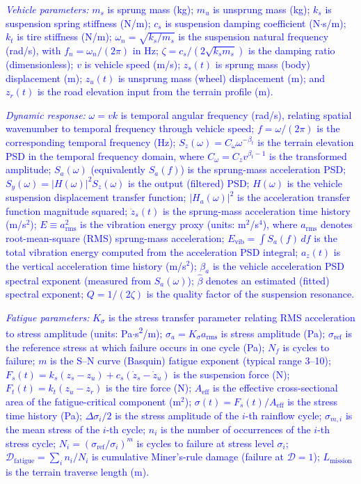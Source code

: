 \documentclass[11pt]{article}
\begin{document}
\textcolor{blue}{\textit{Vehicle parameters:} $m_s$ is sprung mass (kg); $m_u$ is unsprung mass (kg); $k_s$ is suspension spring stiffness (N/m); $c_s$ is suspension damping coefficient (N$\cdot$s/m); $k_t$ is tire stiffness (N/m); $\omega_n = \sqrt{k_s/m_s}$ is the suspension natural frequency (rad/s), with $f_n = \omega_n/(2\pi)$ in Hz; $\zeta = c_s/(2\sqrt{k_s m_s})$ is the damping ratio (dimensionless); $v$ is vehicle speed (m/s); $z_s(t)$ is sprung mass (body) displacement (m); $z_u(t)$ is unsprung mass (wheel) displacement (m); and $z_r(t)$ is the road elevation input from the terrain profile (m).}

\textcolor{blue}{\textit{Dynamic response:} $\omega = vk$ is temporal angular frequency (rad/s), relating spatial wavenumber to temporal frequency through vehicle speed; $f = \omega/(2\pi)$ is the corresponding temporal frequency (Hz); $S_z(\omega) = C_\omega \omega^{-\beta_t}$ is the terrain elevation PSD in the temporal frequency domain, where $C_\omega = C_z v^{\beta_t - 1}$ is the transformed amplitude; $S_a(\omega)$ (equivalently $S_a(f)$) is the sprung-mass acceleration PSD; $S_y(\omega) = |H(\omega)|^2 S_z(\omega)$ is the output (filtered) PSD; $H(\omega)$ is the vehicle suspension displacement transfer function; $|H_a(\omega)|^2$ is the acceleration transfer function magnitude squared; $\ddot{z}_s(t)$ is the sprung-mass acceleration time history (m/s$^2$); $E \equiv a_{\mathrm{rms}}^2$ is the vibration energy proxy (units: m$^2$/s$^4$), where $a_{\mathrm{rms}}$ denotes root-mean-square (RMS) sprung-mass acceleration; $E_{\mathrm{vib}} = \int S_a(f)\,df$ is the total vibration energy computed from the acceleration PSD integral; $a_z(t)$ is the vertical acceleration time history (m/s$^2$); $\beta_a$ is the vehicle acceleration PSD spectral exponent (measured from $S_a(\omega)$); $\hat{\beta}$ denotes an estimated (fitted) spectral exponent; $Q = 1/(2\zeta)$ is the quality factor of the suspension resonance.}

\textcolor{blue}{\textit{Fatigue parameters:} $K_\sigma$ is the stress transfer parameter relating RMS acceleration to stress amplitude (units: Pa$\cdot$s\textsuperscript{2}/m); $\sigma_a = K_\sigma a_{\mathrm{rms}}$ is stress amplitude (Pa); $\sigma_{\text{ref}}$ is the reference stress at which failure occurs in one cycle (Pa); $N_f$ is cycles to failure; $m$ is the S--N curve (Basquin) fatigue exponent (typical range 3--10); $F_s(t) = k_s(z_s - z_u) + c_s(\dot{z}_s - \dot{z}_u)$ is the suspension force (N); $F_t(t) = k_t(z_u - z_r)$ is the tire force (N); $A_{\text{eff}}$ is the effective cross-sectional area of the fatigue-critical component (m$^2$); $\sigma(t) = F_s(t)/A_{\text{eff}}$ is the stress time history (Pa); $\Delta\sigma_i / 2$ is the stress amplitude of the $i$-th rainflow cycle; $\sigma_{m,i}$ is the mean stress of the $i$-th cycle; $n_i$ is the number of occurrences of the $i$-th stress cycle; $N_i = (\sigma_{\text{ref}}/\sigma_i)^m$ is cycles to failure at stress level $\sigma_i$; $\mathcal{D}_{\text{fatigue}} = \sum_i n_i/N_i$ is cumulative Miner's-rule damage (failure at $\mathcal{D} = 1$); $L_{\text{mission}}$ is the terrain traverse length (m).}
\end{document}
